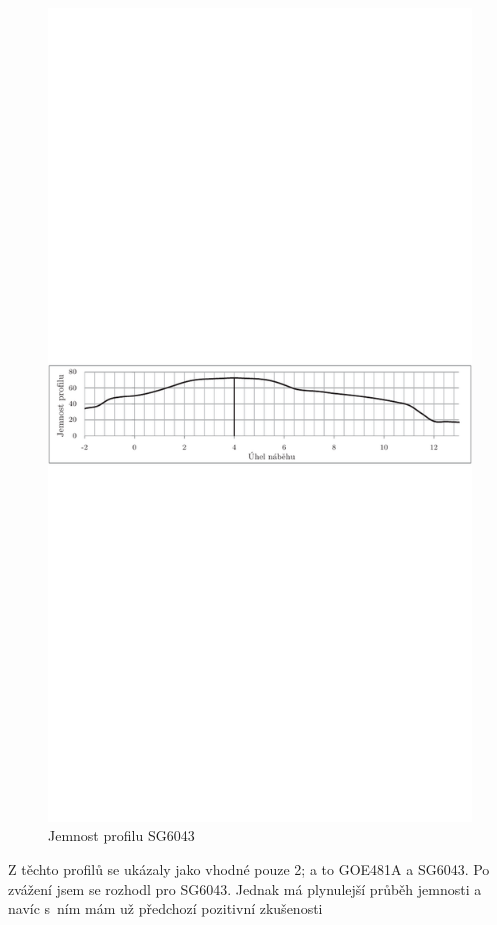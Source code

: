 			\begin{figure}[H]
					\centering
					\includegraphics[]{obrazky/grafy/sgjp}
					\caption{Jemnost profilu SG6043}
					\label{profil:sgj}
			\end{figure}
	
	Z těchto profilů se ukázaly jako vhodné pouze 2; a to GOE481A a SG6043. Po zvážení jsem se rozhodl pro SG6043. Jednak má plynulejší průběh jemnosti a navíc s~ním mám už předchozí pozitivní zkušenosti
	
